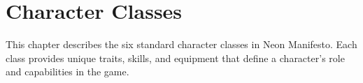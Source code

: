 \section{Character Classes}
This chapter describes the six standard character classes in Neon Manifesto. Each class provides unique traits, skills, and equipment that define a character's role and capabilities in the game.







